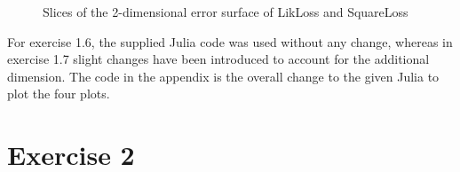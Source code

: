\documentclass[fleqn]{article}
\begin{document}
\begin{figure}[H]
    \centering
    \qquad
    \caption{Slices of the 2-dimensional error surface of LikLoss and SquareLoss}
    \label{fig:ex17}
\end{figure}
For exercise 1.6, the supplied Julia code was used without any change, whereas in exercise 1.7 slight changes have been introduced to account for the additional dimension. The code in the appendix is the overall change to the given Julia to plot the four plots.

\section*{Exercise 2}
\end{document}
